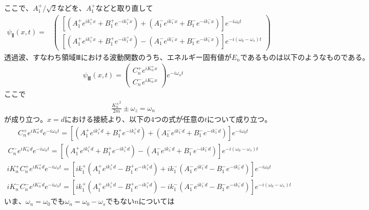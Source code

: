 $ここで、A_{1}^{+}/\sqrt{2}などを、A_{1}^{+}などと取り直して$
\begin{align}
{\psi}_{Ⅱ}(x,t) 
=&\begin{pmatrix}
\left[(A_{1}^{+}e^{ik_{1}^{+}x}+B_{1}^{+}e^{-ik_{1}^{+}x})+(A_{1}^{-}e^{ik_{1}^{-}x}+B_{1}^{-}e^{-ik_{1}^{-}x})\right]e^{-i\omega_{0}t} \\
\left[(A_{1}^{+}e^{ik_{1}^{+}x}+B_{1}^{+}e^{-ik_{1}^{+}x})-(A_{1}^{-}e^{ik_{1}^{-}x}+B_{1}^{-}e^{-ik_{1}^{-}x})\right]e^{-i(\omega_{0}-\omega_{s})t}
\end{pmatrix}
\end{align}
$透過波、すなわち領域Ⅲにおける波動関数のうち、エネルギー固有値がE_{n}であるものは以下のようなものである。$
\begin{align}
{\psi}_{Ⅲ}(x,t)=
\begin{pmatrix}
C_{n}^{+}e^{iK_{n}^{+}x} \\
C_{n}^{-}e^{iK_{n}^{-}x}
\end{pmatrix}
e^{-i\omega_{n}t}
\end{align}
ここで
\begin{align}
\frac{{K_{n}^{\pm}}^2}{2m}{\pm}\omega_{z}=\omega_{n}
\end{align}
$が成り立つ。x=dにおける接続より、以下の4つの式が任意のtについて成り立つ。$
\begin{align}
C_{n}^{+}e^{iK_{n}^{+}d}e^{-i\omega_{n}t}=\left[(A_{1}^{+}e^{ik_{1}^{+}d}+B_{1}^{+}e^{-ik_{1}^{+}d})+(A_{1}^{-}e^{ik_{1}^{-}d}+B_{1}^{-}e^{-ik_{1}^{-}d})\right]e^{-i\omega_{0}t}
\end{align}
\begin{align}
C_{n}^{-}e^{iK_{n}^{-}d}e^{-i\omega_{n}t}=\left[(A_{1}^{+}e^{ik_{1}^{+}d}+B_{1}^{+}e^{-ik_{1}^{+}d})-(A_{1}^{-}e^{ik_{1}^{-}d}+B_{1}^{-}e^{-ik_{1}^{-}d})\right]e^{-i(\omega_{0}-\omega_{s})t}
\end{align}
\begin{align}
iK_{n}^{+}C_{n}^{+}e^{iK_{n}^{+}d}e^{-i\omega_{n}t}=\left[ik_{1}^{+}(A_{1}^{+}e^{ik_{1}^{+}d}-B_{1}^{+}e^{-ik_{1}^{+}d})+ik_{1}^{-}(A_{1}^{-}e^{ik_{1}^{-}d}-B_{1}^{-}e^{-ik_{1}^{-}d})\right]e^{-i\omega_{0}t}
\end{align}
\begin{align}
iK_{n}^{-}C_{n}^{-}e^{iK_{n}^{-}d}e^{-i\omega_{n}t}=\left[ik_{1}^{+}(A_{1}^{+}e^{ik_{1}^{+}d}-B_{1}^{+}e^{-ik_{1}^{+}d})-ik_{1}^{-}(A_{1}^{-}e^{ik_{1}^{-}d}-B_{1}^{-}e^{-ik_{1}^{-}d})\right]e^{-i(\omega_{0}-\omega_{s})t}
\end{align}
$いま、\omega_{n}=\omega_{0}でも\omega_{n}=\omega_{0}-\omega_{s}でもないnについては$
